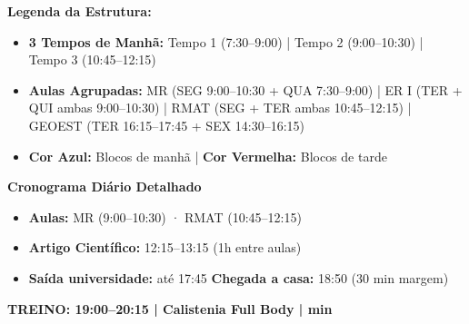 \documentclass[a4paper,11pt]{article}
\newcommand{\mysection}[1]{%
  \vspace{16pt}
  \noindent\colorbox{dark}{\parbox{\linewidth}{\color{white}\large\bfseries\quad #1}}
  \vspace{8pt}\par
}
\newcommand{\badge}[2]{%
  \colorbox{#1}{\color{white}\footnotesize\textbf{\strut\;#2\;}}%
}
\begin{document}
\vspace{12pt}

\begin{tcolorbox}[enhanced, colback=softbg, colframe=dark, sharp corners, left=6pt, right=6pt, top=6pt, bottom=6pt, boxrule=1pt]
  \textbf{Legenda da Estrutura:}
  \begin{itemize}[leftmargin=0.5em, itemsep=2pt, topsep=3pt, partopsep=0pt]
    \item \textbf{3 Tempos de Manhã:} Tempo 1 (7:30--9:00) | Tempo 2 (9:00--10:30) | Tempo 3 (10:45--12:15)
    \item \textbf{Aulas Agrupadas:} MR (SEG 9:00--10:30 + QUA 7:30--9:00) | ER I (TER + QUI ambas 9:00--10:30) | RMAT (SEG + TER ambas 10:45--12:15) | GEOEST (TER 16:15--17:45 + SEX 14:30--16:15)
    \item \textbf{Cor Azul:} Blocos de manhã | \textbf{Cor Vermelha:} Blocos de tarde
  \end{itemize}
\end{tcolorbox}

\newpage

\mysection{Cronograma Diário Detalhado}

\vspace{6pt}

\begin{tcolorbox}[daybox, title={\badge{forca}{SEGUNDA} \quad Full Body Força + Artigo Científico}]
  \begin{itemize}[leftmargin=1em, itemsep=2pt]
    \item \textbf{Aulas:} MR (9:00--10:30) · RMAT (10:45--12:15)
    \item \textbf{Artigo Científico:} 12:15--13:15 (1h entre aulas)
    \item \textbf{Saída universidade:} até 17:45 \quad \textbf{Chegada a casa:} 18:50 (30 min margem)
  \end{itemize}
  \vspace{4pt}
  \begin{tcolorbox}[enhanced, colback=forca!10, colframe=forca, sharp corners, boxrule=1pt, left=5pt]
    \textbf{TREINO: 19:00--20:15 \;|\; Calistenia Full Body \;| min}
  \end{tcolorbox}
\end{tcolorbox}

\vspace{6pt}
\end{document}
